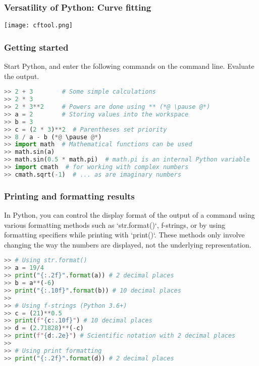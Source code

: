 \begin{frame}
\frametitle{Versatility of Python: Curve fitting}
\centering\texttt{[image: cftool.png]}
\end{frame}

\begin{frame}[fragile]
  \frametitle{Getting started}
   Start Python, and enter the following commands on the command line. Evaluate the output.
   \pause
   \begin{lstlisting}[language=Python,numbers=none]
>> 2 + 3        # Some simple calculations
>> 2 * 3
>> 2 * 3**2     # Powers are done using ** (*@ \pause @*)
>> a = 2        # Storing values into the workspace
>> b = 3
>> c = (2 * 3)**2  # Parentheses set priority
>> 8 / a - b (*@ \pause @*)
>> import math  # Mathematical functions can be used 
>> math.sin(a)  
>> math.sin(0.5 * math.pi)  # math.pi is an internal Python variable
>> import cmath  # for working with complex numbers
>> cmath.sqrt(-1)  # ... as are imaginary numbers    
   \end{lstlisting}
 \end{frame}
 

 \begin{frame}[fragile]
  \frametitle{Printing and formatting results}
  In Python, you can control the display format of the output of a command using various formatting methods such as `str.format()`, f-strings, or by using formatting specifiers while printing with `print()`. These methods only involve changing the way the numbers are displayed, not the underlying representation.
  
  \begin{lstlisting}[language=Python,numbers=none]
>> # Using str.format()
>> a = 19/4
>> print("{:.2f}".format(a)) # 2 decimal places
>> b = a**(-6)
>> print("{:.10f}".format(b)) # 10 decimal places
>> 
>> # Using f-strings (Python 3.6+)
>> c = (21)**0.5
>> print(f"{c:.10f}") # 10 decimal places
>> d = (2.71828)**(-c) 
>> print(f"{d:.2e}") # Scientific notation with 2 decimal places
>> 
>> # Using print formatting
>> print("{:.2f}".format(d)) # 2 decimal places
  \end{lstlisting}
\end{frame}

